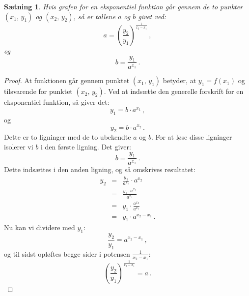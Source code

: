 \documentclass[12pt,oneside,a4paper]{article}
\newcommand{\bas}{\begin{eqnarray*}}
\newcommand{\eas}{\end{eqnarray*}}
\theoremstyle{plain}
\newtheorem*{thm}{Sætning}
\begin{document}
\begin{thm}
    Hvis grafen for en eksponentiel funktion går gennem de to punkter $(x_1,
    \,y_1)$ og $(x_2, \,y_2)$, så er tallene $a$ og $b$ givet ved:
    $$
    a = \left(\frac{y_2}{y_1}\right)^{\frac{1}{x_2-x_1}}\,,
    $$
    og
    $$
    b = \frac{y_1}{a^{x_1}}\,.
    $$
\end{thm}
\begin{proof}
    At funktionen går gennem punktet $(x_1, \,y_1)$ betyder, at $y_1 = f(x_1)$
    og tilsvarende for punktet $(x_2,\,y_2)$. Ved at indsætte den generelle
    forskrift for en eksponentiel funktion, så giver det:
    $$
    y_1 = b\cdot a^{x_1}\,,
    $$
    og 
    $$
    y_2 = b \cdot a^{x_2}\,.
    $$
    Dette er to ligninger med de to ubekendte $a$ og $b$. For at løse disse ligninger
    isolerer vi $b$ i den første ligning. Det giver:
    $$
    b = \frac{y_1}{a^{x_1}}\,.
    $$
    Dette indsættes i den anden ligning, og så omskrives resultatet:
    \bas
    y_2 &=& \frac{y_1}{a^{x_1}} \cdot a^{x_2} \\
    &=& \frac{y_1 \cdot a^{x_2}}{a^{x_1}} \\
    &=& y_1 \cdot \frac{a^{x_2}}{a^{x_1}} \\
    &=& y_1 \cdot a^{x_2-x_1}\,.
    \eas
    Nu kan vi dividere med $y_1$:
    $$
    \frac{y_2}{y_1} = a^{x_2-x_1}\,,
    $$
    og til sidst opløftes begge sider i potensen $\frac{1}{x_2-x_1}$:
    $$
    \left(\frac{y_2}{y_1}\right)^{\frac{1}{x_2-x_1}} = a\,.
    $$
\end{proof}
\end{document}
